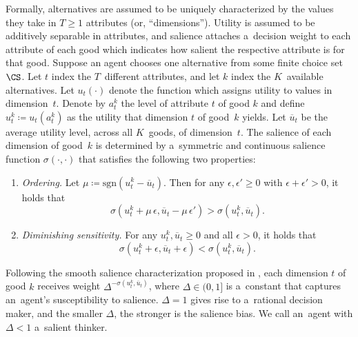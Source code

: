 Formally, alternatives are assumed to be uniquely characterized by the values they take in ${T \geq 1}$ attributes (or, ``dimensions''). Utility is assumed to be additively separable in attributes, and salience attaches a~decision weight to each attribute of each good which indicates how salient the respective attribute is for that good. Suppose an agent chooses one alternative from some finite choice set $\CS$. Let $t$ index the $T$~different attributes, and let $k$ index the $K$~available alternatives. Let $u_t(\cdot)$ denote the function which assigns utility to values in dimension~$t$.
Denote by $a^k_{t}$ the level of attribute $t$ of good $k$ and define ${u^k_t \coloneqq u_t(a^k_t)}$ as the utility that dimension $t$ of good~$k$ yields. Let $\overline{u}_t$ be the average utility level, across all $K$~goods, of dimension~$t$. The salience of each dimension of good~$k$ is determined by a~symmetric and continuous salience function ${\sigma(\cdot, \cdot)}$ that satisfies the following two properties:
\begin{enumerate}
\item \emph{Ordering.} Let ${\mu \coloneqq \mathrm{sgn}(u^k_t - \overline{u}_t)}$. Then for any ${\epsilon,\epsilon' \geq 0}$ with ${\epsilon + \epsilon' > 0}$, it holds that~
\begin{equation}
	\sigma(u^k_t + \mu\,\epsilon, \overline{u}_t - \mu\,\epsilon') > \sigma (u^k_t,\overline{u}_t).
\end{equation}
\item \emph{Diminishing sensitivity.} For any ${u^k_t, \overline{u}_t \geq 0}$ and all ${\epsilon > 0}$, it holds that
\begin{equation}
	\sigma(u^k_t + \epsilon, \overline{u}_t + \epsilon) < \sigma(u^k_t,\overline{u}_t).
\end{equation}
\end{enumerate}

Following the smooth salience characterization proposed in \cite[p.\,1255]{Bordalo2012}, each dimension $t$ of good $k$ receives weight $\Delta^{-\sigma(u^k_t, \overline{u}_t)}$, where ${\Delta \in (0, 1]}$ is a~constant that captures an~agent's susceptibility to salience. ${\Delta = 1}$ gives rise to a~rational decision maker, and the smaller $\Delta$, the stronger is the salience bias. We call an~agent with ${\Delta < 1}$ a~salient thinker.